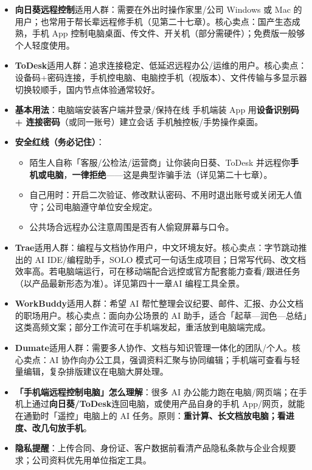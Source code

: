 \begin{itemize}
  \item \textbf{向日葵远程控制}适用人群：需要在外出时操作家里/公司 Windows 或 Mac 的用户；也常用于帮长辈远程修手机（见第二十七章）。核心卖点：国产生态成熟，手机 App 控制电脑桌面、传文件、开关机（部分需硬件）；免费版一般够个人轻度使用。
  \item \textbf{ToDesk}适用人群：追求连接稳定、低延迟远程办公/运维的用户。核心卖点：设备码+密码连接，手机控电脑、电脑控手机（视版本）、文件传输与多显示器切换较顺手，国内节点体验通常较好。
  \item \textbf{基本用法}：电脑端安装客户端并登录/保持在线 手机端装 App 用\textbf{设备识别码 + 连接密码}（或同一账号）建立会话 手机触控板/手势操作桌面。
  \item \textbf{安全红线（务必记住）}：
  \begin{itemize}
    \item 陌生人自称「客服/公检法/运营商」让你装向日葵、ToDesk 并远程你\textbf{手机或电脑}，\textbf{一律拒绝}——这是典型诈骗手法（详见第二十七章）。
    \item 自己用时：开启二次验证、修改默认密码、不用时退出账号或关闭无人值守；公司电脑遵守单位安全规定。
    \item 公共场合远程办公注意周围是否有人偷窥屏幕与口令。
  \end{itemize}
\end{itemize}


\begin{itemize}
  \item \textbf{Trae}适用人群：编程与文档协作用户，中文环境友好。核心卖点：字节跳动推出的 AI IDE/编程助手，SOLO 模式可一句话生成项目；日常写代码、改文档效率高。若电脑端运行，可在移动端配合远控或官方配套能力查看/跟进任务（以产品最新形态为准）。详见第四十一章AI 编程工具全景。
  \item \textbf{WorkBuddy}适用人群：希望 AI 帮忙整理会议纪要、邮件、汇报、办公文档的职场用户。核心卖点：面向办公场景的 AI 助手，适合「起草—润色—总结」这类高频文案；部分工作流可在手机端发起，重活放到电脑端完成。
  \item \textbf{Dumate}适用人群：需要多人协作、文档与知识管理一体化的团队/个人。核心卖点：AI 协作向办公工具，强调资料汇聚与协同编辑；手机端可查看与轻量编辑，复杂排版建议在电脑大屏处理。
  \item \textbf{「手机端远程控制电脑」怎么理解}：很多 AI 办公能力跑在电脑/网页端；在手机上通过\textbf{向日葵/ToDesk}连回电脑，或使用产品自身的手机 App/网页，就能在通勤时「遥控」电脑上的 AI 任务。原则：\textbf{重计算、长文档放电脑；看进度、改几句放手机}。
  \item \textbf{隐私提醒}：上传合同、身份证、客户数据前看清产品隐私条款与企业合规要求；公司资料优先用单位指定工具。
\end{itemize}

